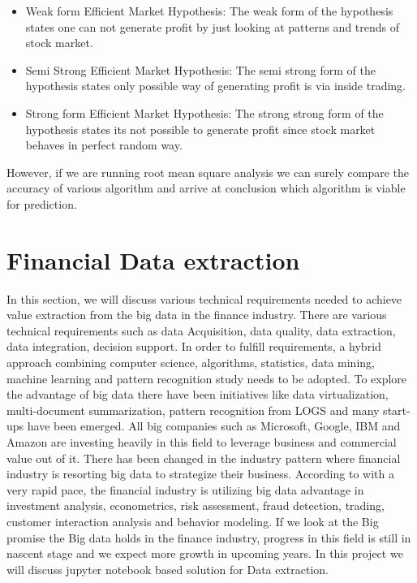 \begin{itemize}

\item Weak form Efficient Market Hypothesis: The weak form of the hypothesis states one can not generate profit by just looking at patterns and trends of stock market.  
\item Semi Strong Efficient Market Hypothesis: The semi strong form of the hypothesis states only possible way of generating profit is via inside trading. 
\item Strong form Efficient Market Hypothesis: The strong strong form of the hypothesis states its not possible to generate profit since stock market behaves in perfect random way. 
\end{itemize}
 
 
However, if we are running root mean square analysis we can surely compare the accuracy of various algorithm and arrive at conclusion which algorithm 
is viable for prediction.


\section{Financial Data extraction}

In this section, we will discuss various technical requirements needed to achieve value extraction from the big data in the finance industry. 
There are various technical requirements such as data Acquisition, data quality, data extraction, data integration, decision support. 
In order to fulfill requirements, a hybrid approach combining computer science, algorithms, statistics, data mining, machine learning and pattern recognition 
study needs to be adopted. To explore the advantage of big data there have been initiatives like data virtualization, multi-document summarization, 
pattern recognition from LOGS and many start-ups have been emerged.  All big companies such as Microsoft, Google, IBM and Amazon are investing heavily in this 
field to leverage business and commercial value out of it. There has been changed in the industry pattern where financial industry is resorting big data to 
strategize their business. According to \cite{Ref3}  with a very rapid pace, the financial industry is utilizing big data advantage in investment analysis,
econometrics, risk assessment, fraud detection, trading, customer interaction analysis and behavior modeling. If we look at the Big promise the Big data holds 
in the finance industry, progress in this field is still in nascent stage and we expect more growth in upcoming years.  In this project we will discuss jupyter 
notebook based solution for Data extraction. 

